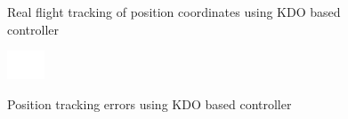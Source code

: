 \documentclass[letterpaper%
, twoside%
, 12pt%
,memoire%
, english%
,creativecommons,hyperref%
]{thETS}
\theoremstyle{newThmStyle}
\begin{document}
\begin{figure}[H]
	\centering
	\parbox{0.75\textwidth}{\caption{Real flight tracking of position coordinates using KDO based controller\label{Fig:xyztracKDO}}}
\end{figure}
\begin{figure}[H]
	\includegraphics[width=0.1\textwidth]{Figures/blank.png}
\end{figure}
\begin{figure}[H]
	\centering
	\parbox{0.75\textwidth}{\caption{Position tracking errors using KDO based controller\label{Fig:xyzerrKDO}}}
\end{figure}
\end{document}
